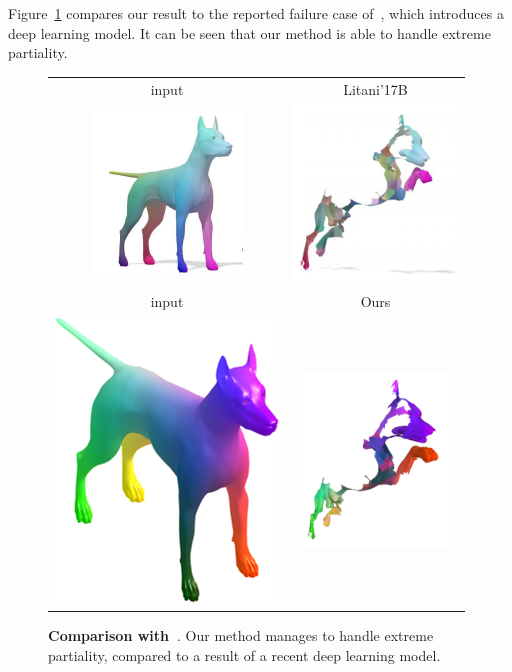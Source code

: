 Figure~\ref{fig:litani} compares our result to the reported failure case  of~\cite{litany2017deep}, which introduces a deep learning model.
It can be seen that our method is able to handle extreme partiality.




\begin{figure}[h!]
	\centering
	\begin{tabular}{cc}
		input  & Litani'17B\cite{litany2017deep}\\
		\includegraphics[scale=0.7]{figures/litanibase.png} &
		\includegraphics[scale=0.7]{figures/Litanires.png} \\
		input & Ours \\
		\includegraphics[scale=0.7]{figures/dog_base.png} &
		\includegraphics[scale=0.7]{figures/LitaniOurs.png} \\
		
	\end{tabular}
	\caption{{\textbf {Comparison with~\cite{litany2017deep}}.}
		Our method manages to handle extreme partiality, compared to a result of a recent deep learning model.
	}
	\label{fig:litani}
\end{figure}
